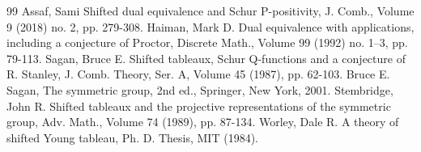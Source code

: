 \documentclass[10pt]{amsart}
\theoremstyle{definition}
\begin{document}
\begin{thebibliography}{99}
 Assaf, Sami Shifted dual equivalence and Schur P-positivity, J. Comb., Volume 9 (2018) no. 2, pp. 279-308.
 Haiman, Mark D. Dual equivalence with applications, including a conjecture of Proctor, Discrete Math., Volume 99 (1992) no. 1–3, pp. 79-113.
 Sagan, Bruce E. Shifted tableaux, Schur Q-functions and a conjecture of R. Stanley, J. Comb. Theory, Ser. A, Volume 45 (1987), pp. 62-103.
 Bruce E. Sagan, The symmetric group, 2nd ed., Springer, New York, 2001.
 Stembridge, John R. Shifted tableaux and the projective representations of the symmetric group, Adv. Math., Volume 74 (1989), pp. 87-134.
 Worley, Dale R. A theory of shifted Young tableau, Ph. D. Thesis, MIT (1984).
\end{thebibliography}
\end{document}

